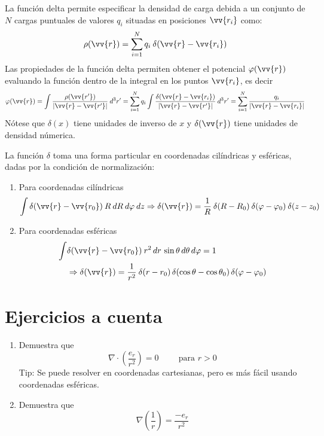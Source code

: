 La función delta permite especificar la densidad de
carga debida a un conjunto de $N$ cargas puntuales de valores $q_{i}$ situadas en posiciones $\vv{r_{i}}$  como:
\begin{equation}
\rho (\vv{r}) = \sum_{i=1}^{N} q_{i} \: \delta(\vv{r} - \vv{r_{i}})
\label{eq:ecuacion_A_04}
\end{equation}
Las propiedades de la función delta permiten obtener el potencial $\varphi(\vv{r})$ evaluando la función dentro de la integral en los puntos $\vv{r_{i}}$, es decir
\begin{equation}
\varphi(\vv{r}) = \int \dfrac{\rho(\vv{r^{\prime}})}{\vert \vv{r} - \vv{r^{\prime}} \vert} \: d^{3}r^{\prime} = \sum_{i=1}^{N} q_{i} \int \dfrac{\delta ( \vv{r} - \vv{r_{i}})}{\vert \vv{r} - \vv{r^{\prime}} \vert} \: d^{3}r^{\prime} = \sum_{i=1}^{N} \dfrac{q_{i}}{\vert \vv{r} - \vv{r_{i}} \vert}
\label{eq:ecuacion_A_05}
\end{equation}
Nótese que $\delta (x)$ tiene unidades de inverso de $x$ y $\delta (\vv{r})$ tiene unidades de densidad númerica.
\par
La función $\delta$ toma una forma particular en coordenadas cilíndricas y esféricas, dadas por la condición de normalización:
\begin{enumerate}
\item Para coordenadas cilíndricas
\begin{equation}
\int \delta (\vv{r} - \vv{r_{0}}) \: R \: dR \: d \varphi \: dz \Rightarrow \delta (\vv{r}) =  \dfrac{1}{R} \: \delta (R - R_{0}) \: \delta (\varphi - \varphi_{0}) \: \delta (z - z_{0})
\end{equation}
\item  Para coordenadas esféricas
\begin{equation}
\begin{aligned}
\int & \delta (\vv{r} - \vv{r_{0}}) \: r^{2} \, dr \, \sin \theta \, d \theta \, d \varphi = 1 \\
&\Rightarrow \delta (\vv{r}) = \dfrac{1}{r^{2}} \: \delta (r - r_{0}) \, \delta (\cos \theta - \cos \theta_{0}) \, \delta (\varphi - \varphi_{0})
\end{aligned}
\end{equation}
\end{enumerate}
\section*{Ejercicios a cuenta}
\begin{enumerate}[label=\roman*.]
\item Demuestra que 
\[ \nabla \cdot \left( \dfrac{e_{r}}{r^{2}} \right) = 0 \hspace{1cm} \mbox{para } r > 0 \]
Tip: Se puede resolver en coordenadas cartesianas, pero es más fácil usando coordenadas esféricas.
\item Demuestra que 
\[ \nabla \left( \dfrac{1}{r} \right) = \dfrac{- e_{r}}{r^{2}} \]
\end{enumerate}
